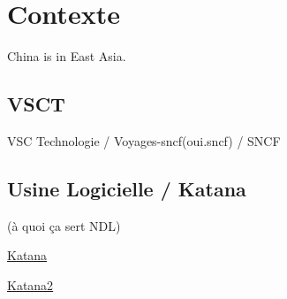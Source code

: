 \section{Contexte} China is in East Asia.
\subsection{VSCT} VSC Technologie / Voyages-sncf(oui.sncf) / SNCF
\subsection{Usine Logicielle / Katana} (à quoi ça sert NDL)

\href{https://wiki.vsct.fr/display/KTN/KATANA+Accueil}{Katana}

\href{https://wiki.vsct.fr/pages/viewpage.action?spaceKey=KTN\&title=Usine+Logicielle+VSCT}{Katana2}
